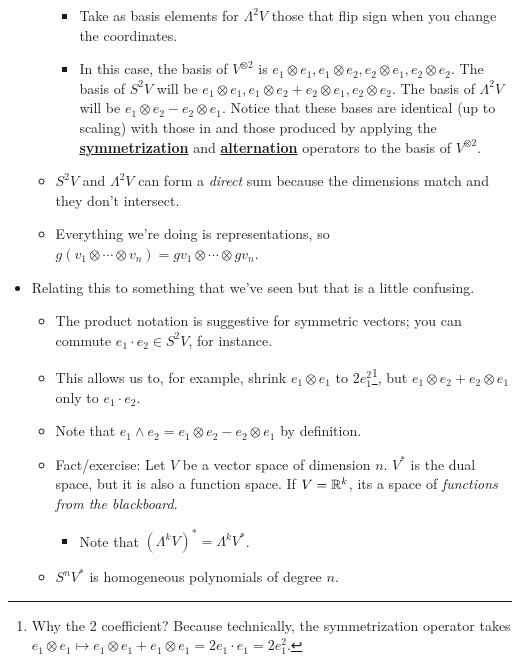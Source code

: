 \documentclass[../notes.tex]{subfiles}
\begin{document}
\begin{itemize}
\begin{itemize}
\begin{itemize}
            \item Take as basis elements for $\Lambda^2V$ those that flip sign when you change the coordinates.
            \item In this case, the basis of $V^{\otimes 2}$ is $e_1\otimes e_1,e_1\otimes e_2,e_2\otimes e_1,e_2\otimes e_2$. The basis of $S^2V$ will be $e_1\otimes e_1,e_1\otimes e_2+e_2\otimes e_1,e_2\otimes e_2$. The basis of $\Lambda^2V$ will be $e_1\otimes e_2-e_2\otimes e_1$. Notice that these bases are identical (up to scaling) with those in \textcite{bib:Serre} and those produced by applying the \href{https://en.wikipedia.org/wiki/Symmetrization}{\textbf{symmetrization}} and \href{https://en.wikipedia.org/wiki/Exterior_algebra#Alternating_tensor_algebra}{\textbf{alternation}} operators to the basis of $V^{\otimes 2}$.
        \end{itemize}
        \item $S^2V$ and $\Lambda^2V$ can form a \emph{direct} sum because the dimensions match and they don't intersect.
        \item Everything we're doing is representations, so $g(v_1\otimes\cdots\otimes v_n)=gv_1\otimes\cdots\otimes gv_n$.
    \end{itemize}
    \item Relating this to something that we've seen but that is a little confusing.
    \begin{itemize}
        \item The product notation is suggestive for symmetric vectors; you can commute $e_1\cdot e_2\in S^2V$, for instance.
        \item This allows us to, for example, shrink $e_1\otimes e_1$ to $2e_1^2$\footnote{Why the 2 coefficient? Because technically, the symmetrization operator takes $e_1\otimes e_1\mapsto e_1\otimes e_1+e_1\otimes e_1=2e_1\cdot e_1=2e_1^2$.}, but $e_1\otimes e_2+e_2\otimes e_1$ only to $e_1\cdot e_2$.
        \item Note that $e_1\wedge e_2=e_1\otimes e_2-e_2\otimes e_1$ by definition.
        \item Fact/exercise: Let $V$ be a vector space of dimension $n$. $V^*$ is the dual space, but it is also a function space. If $V=\mathbb{R}^k$, its a space of \emph{functions from the blackboard}.
        \begin{itemize}
            \item Note that $(\Lambda^kV)^*=\Lambda^kV^*$.
        \end{itemize}
        \item $S^nV^*$ is homogeneous polynomials of degree $n$.

\end{itemize}
\end{itemize}
\end{document}
